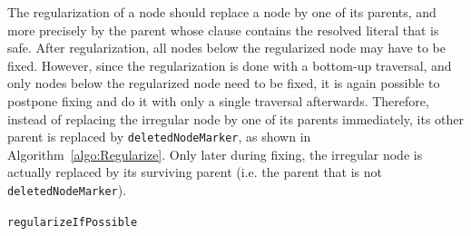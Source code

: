 \documentclass[envcountsame]{llncs}
\begin{document}
The regularization of a node should replace a node by one of its parents, and more precisely by the parent whose clause contains the resolved literal that is safe. After regularization, all nodes below the regularized node may have to be fixed. However, since the regularization is done with a bottom-up traversal, and only nodes below the regularized node need to be fixed, it is again possible to postpone fixing and do it with only a single traversal afterwards. 
Therefore, instead of replacing the irregular node by one of its parents immediately, 
its other parent is replaced by \texttt{deletedNodeMarker}, as shown in Algorithm~\ref{algo:Regularize}. Only later during fixing, 
the irregular node is actually replaced by its surviving parent (i.e. the parent that is not \texttt{deletedNodeMarker}).


\linesnumbered
\begin{algorithm}[t]
\begin{footnotesize}
\SetLine
{}


\BlankLine
\caption{\label{algo:Regularize} \texttt{regularizeIfPossible}}
\end{footnotesize}
\end{algorithm}
\end{document}
